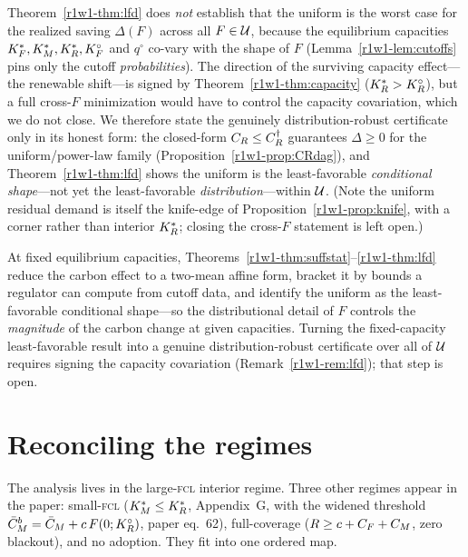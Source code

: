 \begin{remark}\label{r1w1-rem:lfd}
Theorem~\ref{r1w1-thm:lfd} does \emph{not} establish that the uniform is the worst case
for the realized saving $\Delta(F)$ across all $F\in\mathcal U$, because the equilibrium
capacities $K_F^{*},K_M^{*},K_R^{*},K_F^{\circ}$ and $q^{\circ}$ co-vary with the shape of $F$
(Lemma~\ref{r1w1-lem:cutoffs} pins only the cutoff \emph{probabilities}). The direction
of the surviving capacity effect---the renewable shift---is signed by
Theorem~\ref{r1w1-thm:capacity} ($K_R^{*}>K_R^{\circ}$), but a full cross-$F$ minimization would
have to control the capacity covariation, which we do not close. We therefore
state the genuinely distribution-robust certificate only in its honest form: the
closed-form $C_R\le C_R^{\dagger}$ guarantees $\Delta\ge0$ for the uniform/power-law
family (Proposition~\ref{r1w1-prop:CRdag}), and Theorem~\ref{r1w1-thm:lfd} shows the uniform
is the least-favorable \emph{conditional shape}---not yet the least-favorable
\emph{distribution}---within $\mathcal U$. (Note the uniform residual demand is itself
the knife-edge of Proposition~\ref{r1w1-prop:knife}, with a corner rather than interior
$K_R^{*}$; closing the cross-$F$ statement is left open.)
\end{remark}

\begin{remark}
At fixed equilibrium capacities, Theorems~\ref{r1w1-thm:suffstat}--\ref{r1w1-thm:lfd} reduce
the carbon effect to a two-mean affine form, bracket it by bounds a regulator can
compute from cutoff data, and identify the uniform as the least-favorable
conditional shape---so the distributional detail of $F$ controls the
\emph{magnitude} of the carbon change at given capacities. Turning the
fixed-capacity least-favorable result into a genuine distribution-robust
certificate over all of $\mathcal U$ requires signing the capacity covariation
(Remark~\ref{r1w1-rem:lfd}); that step is open.
\end{remark}

\section{Reconciling the regimes}\label{r1w1-sec:regimes}

The analysis lives in the large-\textsc{fcl} interior regime. Three other regimes
appear in the paper: small-\textsc{fcl} ($K_M^{*}\le K_R^{*}$, Appendix~G, with the
widened threshold $\bar C_M^{b}=\bar C_M+c\,F(0;K_R^{\circ})$, paper eq.\ 62), full-coverage
($R\ge c+C_F+C_M$, zero blackout), and no adoption. They fit into one ordered map.


